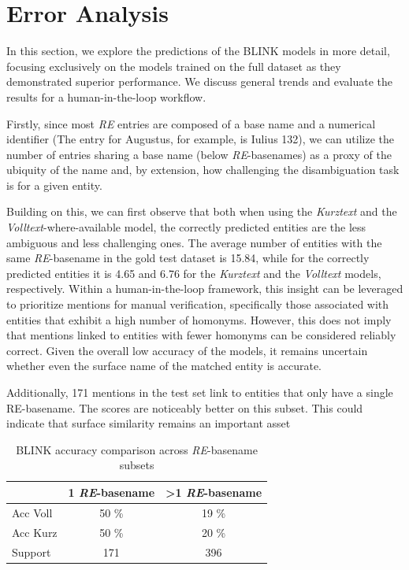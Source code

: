 \documentclass[final]{anthology-ch}
\begin{document}
\section{Error Analysis}\label{sec:analysis}

In this section, we explore the predictions of the BLINK models in more detail, focusing exclusively on the models trained on the full dataset as they demonstrated superior performance. We discuss general trends and evaluate the results for a human-in-the-loop workflow.

Firstly, since most \textit{RE} entries are composed of a base name and a numerical identifier (The entry for Augustus, for example, is Iulius 132), we can utilize the number of entries sharing a base name (below \textit{RE}-basenames) as a proxy of the ubiquity of the name and, by extension, how challenging the disambiguation task is for a given entity.

Building on this, we can first observe that both when using the \textit{Kurztext} and the \textit{Volltext}-where-available model, the correctly predicted entities are the less ambiguous and less challenging ones. The average number of entities with the same \textit{RE}-basename in the gold test dataset is 15.84, while for the correctly predicted entities it is 4.65 and 6.76 for the \textit{Kurztext} and the \textit{Volltext} models, respectively. Within a human-in-the-loop framework, this insight can be leveraged to prioritize mentions for manual verification, specifically those associated with entities that exhibit a high number of homonyms. However, this does not imply that mentions linked to entities with fewer homonyms can be considered reliably correct. Given the overall low accuracy of the models, it remains uncertain whether even the surface name of the matched entity is accurate.

Additionally, 171 mentions in the test set link to entities that only have a single RE-basename. The scores are noticeably better on this subset. This could indicate that surface similarity remains an important asset

\begin{table}[ht]
\centering
\begin{tabular}{lcc}
\hline
 & \textbf{1 \textit{RE}-basename} & \textbf{>1 \textit{RE}-basename} \\
\hline
Acc Voll & 50 \% &  19 \% \\
Acc Kurz &  50 \% & 20 \%\\
Support & 171 & 396 \\
\hline
\end{tabular}
\caption{BLINK accuracy comparison across \textit{RE}-basename subsets}
\label{tab:re_basename_accuracy}
\end{table}
\end{document}
